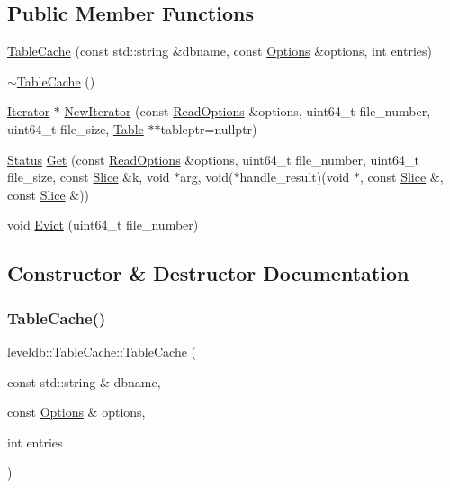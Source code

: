 \subsection*{Public Member Functions}
\begin{DoxyCompactItemize}
\item 
\mbox{\hyperlink{classleveldb_1_1_table_cache_a3982d03d396826d23051c1920efc8636}{Table\+Cache}} (const std\+::string \&dbname, const \mbox{\hyperlink{structleveldb_1_1_options}{Options}} \&options, int entries)
\item 
\mbox{\hyperlink{classleveldb_1_1_table_cache_a5690fd10ea7cc7f0d44c8e768bea872c}{$\sim$\+Table\+Cache}} ()
\item 
\mbox{\hyperlink{classleveldb_1_1_iterator}{Iterator}} $\ast$ \mbox{\hyperlink{classleveldb_1_1_table_cache_ab3312c170081afb56900b50758765151}{New\+Iterator}} (const \mbox{\hyperlink{structleveldb_1_1_read_options}{Read\+Options}} \&options, uint64\+\_\+t file\+\_\+number, uint64\+\_\+t file\+\_\+size, \mbox{\hyperlink{classleveldb_1_1_table}{Table}} $\ast$$\ast$tableptr=nullptr)
\item 
\mbox{\hyperlink{classleveldb_1_1_status}{Status}} \mbox{\hyperlink{classleveldb_1_1_table_cache_af43ba38b52742e9f5589321747535444}{Get}} (const \mbox{\hyperlink{structleveldb_1_1_read_options}{Read\+Options}} \&options, uint64\+\_\+t file\+\_\+number, uint64\+\_\+t file\+\_\+size, const \mbox{\hyperlink{classleveldb_1_1_slice}{Slice}} \&k, void $\ast$arg, void($\ast$handle\+\_\+result)(void $\ast$, const \mbox{\hyperlink{classleveldb_1_1_slice}{Slice}} \&, const \mbox{\hyperlink{classleveldb_1_1_slice}{Slice}} \&))
\item 
void \mbox{\hyperlink{classleveldb_1_1_table_cache_a57b81c58ff0533514b3a5d1652f044bc}{Evict}} (uint64\+\_\+t file\+\_\+number)
\end{DoxyCompactItemize}


\subsection{Constructor \& Destructor Documentation}
\mbox{\label{classleveldb_1_1_table_cache_a3982d03d396826d23051c1920efc8636}} 
\subsubsection{\texorpdfstring{TableCache()}{TableCache()}}
{\footnotesize\ttfamily leveldb\+::\+Table\+Cache\+::\+Table\+Cache (\begin{DoxyParamCaption}\item[{const std\+::string \&}]{dbname,  }\item[{const \mbox{\hyperlink{structleveldb_1_1_options}{Options}} \&}]{options,  }\item[{int}]{entries }\end{DoxyParamCaption})}

